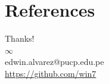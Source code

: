 \documentclass[aspectratio=169]{beamer}
\begin{document}


    

\section*{References}
    \begin{frame}[allowframebreaks]
        \footnotesize %
        
        
        
    \end{frame}

    \begin{frame}
        \begin{center}
            {\Huge\calligra Thanks!} \\
            {\Huge $\infty$} \\
            edwin.alvarez@pucp.edu.pe \\
            \url{https://github.com/win7}
        \end{center}
    \end{frame}
\end{document}

